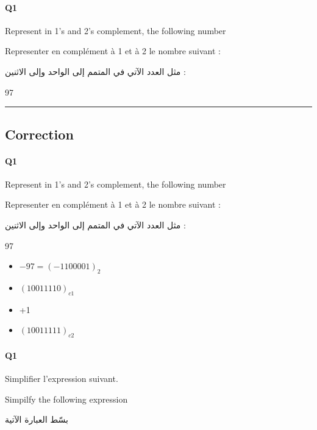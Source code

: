\pagebreak

\paragraph{Q1}

Represent in 1's and 2's complement, the following number


Representer en complément à 1 et à 2 le nombre suivant :


\begin{arab}[utf]
مثل  العدد الآتي في المتمم إلى الواحد وإلى الاثنين  :
\end{arab}

97




\hrule width 1\linewidth
\pagebreak

\subsection{Correction}


\paragraph{Q1}

Represent in 1's and 2's complement, the following number


Representer en complément à 1 et à 2 le nombre suivant :


\begin{arab}[utf]
مثل  العدد الآتي في المتمم إلى الواحد وإلى الاثنين  :
\end{arab}

97


\begin{itemize}
\item $-97 = ( -1100001 )_{2}$
\item $( 10011110 )_{c1}$
\item +1
\item $( 10011111 )_{c2}$
\end{itemize}

\pagebreak

\paragraph{Q1}



Simplifier l'expression suivant.



Simpilfy the following expression
\begin{arab}[utf]
بسّط العبارة الآتية
\end{arab}

